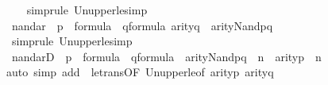 \begin{isabellebody}
%
\isadelimproof
\ \ %
\endisadelimproof
%
\isatagproof
{}\isamarkupfalse%
\ {\isacharparenleft}{\kern0pt}simp{\isacharcomma}{\kern0pt}rule\ Un{\isacharunderscore}{\kern0pt}upper{}{\isacharunderscore}{\kern0pt}le{\isacharcomma}{\kern0pt}simp{\isacharplus}{\kern0pt}{\isacharparenright}{\kern0pt}%
\endisatagproof
{\isafoldproof}%
%
\isadelimproof
\isanewline
%
\endisadelimproof
{}\isamarkupfalse%
\ nand{\isacharunderscore}{\kern0pt}ar{}\ {\isacharcolon}{\kern0pt}\ {\isachardoublequoteopen}p\ {\isasymin}\ formula\ {\isasymLongrightarrow}\ q{\isasymin}formula\ {\isasymLongrightarrow}arity{\isacharparenleft}{\kern0pt}q{\isacharparenright}{\kern0pt}\ {\isasymle}\ arity{\isacharparenleft}{\kern0pt}Nand{\isacharparenleft}{\kern0pt}p{\isacharcomma}{\kern0pt}q{\isacharparenright}{\kern0pt}{\isacharparenright}{\kern0pt}{\isachardoublequoteclose}\isanewline
%
\isadelimproof
\ \ %
\endisadelimproof
%
\isatagproof
{}\isamarkupfalse%
\ {\isacharparenleft}{\kern0pt}simp{\isacharcomma}{\kern0pt}rule\ Un{\isacharunderscore}{\kern0pt}upper{}{\isacharunderscore}{\kern0pt}le{\isacharcomma}{\kern0pt}simp{\isacharplus}{\kern0pt}{\isacharparenright}{\kern0pt}%
\endisatagproof
{\isafoldproof}%
%
\isadelimproof
\isanewline
%
\endisadelimproof
\isanewline
{}\isamarkupfalse%
\ nand{\isacharunderscore}{\kern0pt}ar{}D\ {\isacharcolon}{\kern0pt}\ {\isachardoublequoteopen}p\ {\isasymin}\ formula\ {\isasymLongrightarrow}\ q{\isasymin}formula\ {\isasymLongrightarrow}\ arity{\isacharparenleft}{\kern0pt}Nand{\isacharparenleft}{\kern0pt}p{\isacharcomma}{\kern0pt}q{\isacharparenright}{\kern0pt}{\isacharparenright}{\kern0pt}\ {\isasymle}\ n\ {\isasymLongrightarrow}\ arity{\isacharparenleft}{\kern0pt}p{\isacharparenright}{\kern0pt}\ {\isasymle}\ n{\isachardoublequoteclose}\isanewline
%
\isadelimproof
\ \ %
\endisadelimproof
%
\isatagproof
{}\isamarkupfalse%
{\isacharparenleft}{\kern0pt}auto\ simp\ add{\isacharcolon}{\kern0pt}\ \ le{\isacharunderscore}{\kern0pt}trans{\isacharbrackleft}{\kern0pt}OF\ Un{\isacharunderscore}{\kern0pt}upper{}{\isacharunderscore}{\kern0pt}le{\isacharbrackleft}{\kern0pt}of\ {\isachardoublequoteopen}arity{\isacharparenleft}{\kern0pt}p{\isacharparenright}{\kern0pt}{\isachardoublequoteclose}\ {\isachardoublequoteopen}arity{\isacharparenleft}{\kern0pt}q{\isacharparenright}{\kern0pt}{\isachardoublequoteclose}{\isacharbrackright}{\kern0pt}{\isacharbrackright}{\kern0pt}{\isacharparenright}{\kern0pt}%
\endisatagproof
{\isafoldproof}%
%
\isadelimproof

\end{isabellebody}
